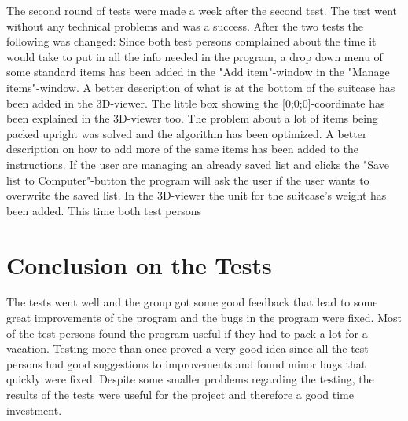 The second round of tests were made a week after the second test. The test went without any technical problems and was a success. After the two tests the following was changed: Since both test persons complained about the time it would take to put in all the info needed in the program, a drop down menu of some standard items has been added in the "Add item"-window in the "Manage items"-window. A better description of what is at the bottom of the suitcase has been added in the 3D-viewer. The little box showing the [0;0;0]-coordinate has been explained in the 3D-viewer too. The problem about a lot of items being packed upright was solved and the algorithm has been optimized. A better description on how to add more of the same items has been added to the instructions. If the user are managing an already saved list and clicks the "Save list to Computer"-button the program will ask the user if the user wants to overwrite the saved list. In the 3D-viewer the unit for the suitcase's weight has been added. This time both test persons 

\section{Conclusion on the Tests}
The tests went well and the group got some good feedback that lead to some great improvements of the program and the bugs in the program were fixed. Most of the test persons found the program useful if they had to pack a lot for a vacation. Testing more than once proved a very good idea since all the test persons had good suggestions to improvements and found minor bugs that quickly were fixed. Despite some smaller problems regarding the testing, the results of the tests were useful for the project and therefore a good time investment.